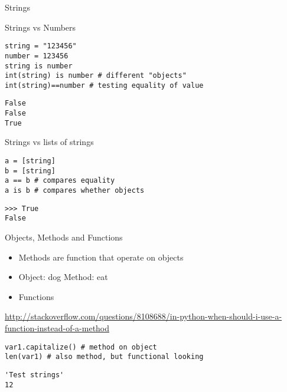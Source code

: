 \documentclass[presentation]{beamer}
\begin{document}
\begin{frame}[fragile,label=sec-4-1-16]{Strings}
 \begin{block}{Strings vs Numbers}
\lstset{numbers=left,language=Python,label= ,caption= }
\begin{lstlisting}
string = "123456"
number = 123456 
string is number
int(string) is number # different "objects"
int(string)==number # testing equality of value
\end{lstlisting}

\lstset{numbers=left,language=Python,label= ,caption= }
\begin{lstlisting}
False
False
True
\end{lstlisting}
\end{block}


\begin{block}{Strings vs lists of strings}
\lstset{numbers=left,language=Python,label= ,caption= }
\begin{lstlisting}
a = [string]
b = [string]
a == b # compares equality
a is b # compares whether objects
\end{lstlisting}

\lstset{numbers=left,language=Python,label= ,caption= }
\begin{lstlisting}
>>> True
False
\end{lstlisting}
\end{block}
\end{frame}

\begin{frame}[fragile,label=sec-4-1-17]{Objects, Methods and Functions}
 \begin{itemize}
\item Methods are function that operate on objects
\item Object: dog Method: eat
\item Functions
\end{itemize}
\url{http://stackoverflow.com/questions/8108688/in-python-when-should-i-use-a-function-instead-of-a-method}


\lstset{numbers=left,language=Python,label= ,caption= }
\begin{lstlisting}
var1.capitalize() # method on object
len(var1) # also method, but functional looking
\end{lstlisting}

\lstset{numbers=left,language=Python,label= ,caption= }
\begin{lstlisting}
'Test strings'
12
\end{lstlisting}
\end{frame}
\end{document}
